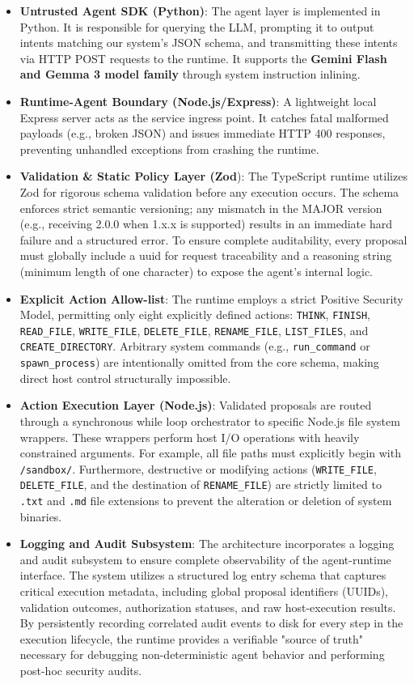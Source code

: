\documentclass[conference]{IEEEtran}
\begin{document}
    \begin{itemize}
        \item \textbf{Untrusted Agent SDK (Python)}:  The agent layer is implemented in Python. It is responsible for querying the LLM, prompting it to output intents matching our system's JSON schema, and transmitting these intents via HTTP POST requests to the runtime. It supports the \textbf{Gemini Flash and Gemma 3 model family} through system instruction inlining.
        \item \textbf{Runtime-Agent Boundary (Node.js/Express)}: A lightweight local Express server acts as the service ingress point. It catches fatal malformed payloads (e.g., broken JSON) and issues immediate HTTP 400 responses, preventing unhandled exceptions from crashing the runtime.
        \item \textbf{Validation \& Static Policy Layer (Zod}): The TypeScript runtime utilizes Zod for rigorous schema validation before any execution occurs. The schema enforces strict semantic versioning; any mismatch in the MAJOR version (e.g., receiving 2.0.0 when 1.x.x is supported) results in an immediate hard failure and a structured error. To ensure complete auditability, every proposal must globally include a uuid for request traceability and a reasoning string (minimum length of one character) to expose the agent's internal logic.
        \item \textbf{Explicit Action Allow-list}: The runtime employs a strict Positive Security Model, permitting only eight explicitly defined actions: \texttt{THINK}, \texttt{FINISH}, \texttt{READ\_FILE}, \texttt{WRITE\_FILE}, \texttt{DELETE\_FILE}, \texttt{RENAME\_FILE}, \texttt{LIST\_FILES}, and \texttt{CREATE\_DIRECTORY}. Arbitrary system commands (e.g., \texttt{run\_command} or \texttt{spawn\_process}) are intentionally omitted from the core schema, making direct host control structurally impossible.
        \item \textbf{Action Execution Layer (Node.js)}: Validated proposals are routed through a synchronous while loop orchestrator to specific Node.js file system wrappers. These wrappers perform host I/O operations with heavily constrained arguments. For example, all file paths must explicitly begin with \texttt{/sandbox/}. Furthermore, destructive or modifying actions (\texttt{WRITE\_FILE}, \texttt{DELETE\_FILE}, and the destination of \texttt{RENAME\_FILE}) are strictly limited to \texttt{.txt} and \texttt{.md} file extensions to prevent the alteration or deletion of system binaries.
        \item \textbf{Logging and Audit Subsystem}: The architecture incorporates a logging and audit subsystem to ensure complete observability of the agent-runtime interface. The system utilizes a structured log entry schema that captures critical execution metadata, including global proposal identifiers (UUIDs), validation outcomes, authorization statuses, and raw host-execution results. By persistently recording correlated audit events to disk for every step in the execution lifecycle, the runtime provides a verifiable "source of truth" necessary for debugging non-deterministic agent behavior and performing post-hoc security audits. 

\end{itemize}
\end{document}
